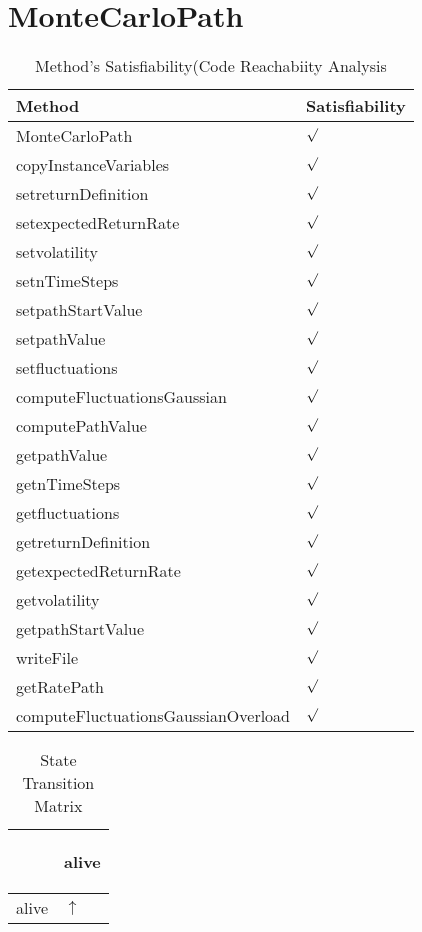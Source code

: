 \documentclass[10pt]{article}
\begin{document}
\section{{\color{Fuchsia}MonteCarloPath}}
\label{MonteCarloPath}
\begin{longtable}{|l|l|}
\caption{Method's Satisfiability(Code Reachabiity Analysis}\\
\hline
Method & Satisfiability\\
\hline
MonteCarloPath&{\color{blue}$\surd$}\\
\hline
copyInstanceVariables&{\color{blue}$\surd$}\\
\hline
setreturnDefinition&{\color{blue}$\surd$}\\
\hline
setexpectedReturnRate&{\color{blue}$\surd$}\\
\hline
setvolatility&{\color{blue}$\surd$}\\
\hline
setnTimeSteps&{\color{blue}$\surd$}\\
\hline
setpathStartValue&{\color{blue}$\surd$}\\
\hline
setpathValue&{\color{blue}$\surd$}\\
\hline
setfluctuations&{\color{blue}$\surd$}\\
\hline
computeFluctuationsGaussian&{\color{blue}$\surd$}\\
\hline
computePathValue&{\color{blue}$\surd$}\\
\hline
getpathValue&{\color{blue}$\surd$}\\
\hline
getnTimeSteps&{\color{blue}$\surd$}\\
\hline
getfluctuations&{\color{blue}$\surd$}\\
\hline
getreturnDefinition&{\color{blue}$\surd$}\\
\hline
getexpectedReturnRate&{\color{blue}$\surd$}\\
\hline
getvolatility&{\color{blue}$\surd$}\\
\hline
getpathStartValue&{\color{blue}$\surd$}\\
\hline
writeFile&{\color{blue}$\surd$}\\
\hline
getRatePath&{\color{blue}$\surd$}\\
\hline
computeFluctuationsGaussianOverload&{\color{blue}$\surd$}\\
\hline
\end{longtable}
\begin{longtable}{|l|l|}
\caption{State Transition Matrix}\\
\hline
&\begin{sideways}alive\end{sideways}\\
\hline
alive&{\color{blue}$\uparrow$}\\
\hline
\end{longtable}
\end{document}
